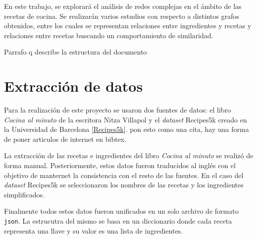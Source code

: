 \documentclass[a4paper]{article}
\newcommand{\todo}[1]{\color{red}#1\color{black}}
\begin{document}
En este trabajo, se explorará el análisis de redes complejas en el ámbito de las
recetas de cocina. Se realizarán varios estudios con respecto a distintos grafos
obtenidos, entre los cuales se representan relaciones entre ingredientes y
recetas y relaciones entre recetas buscando un comportamiento de similaridad.

\todo{Parrafo q describe la estructura del documento}







\section{Extracción de datos}\label{sec:data}

Para la realización de este proyecto se usaron dos fuentes de datos: el libro
\emph{Cocina al minuto} de la escritora Nitza Villapol y el \emph{dataset} Recipes5k creado en la Universidad de Barcelona [\href{http://www.ub.edu/cvub/recipes5k/}{Recipes5k}]. \todo{pon esto como una
cita, hay una forma de poner articulos de internet en bibtex.}

La extracción de las recetas e ingredientes del libro \emph{Cocina al minuto}
se realizó de forma manual. Posteriormente, estos datos fueron traducidos al
inglés con el objetivo de manternet la consistencia con el resto de las
fuentes. En el caso del \emph{dataset} Recipes5k se seleccionaron los nombres
de las recetas y los ingredientes simplificados.

Finalmente todos estos datos fueron unificados en un solo archivo de formato
\texttt{json}. La estrucutra del mismo se basa en un diccionario donde cada
receta representa una llave y su valor es una lista de ingredientes.
\end{document}
